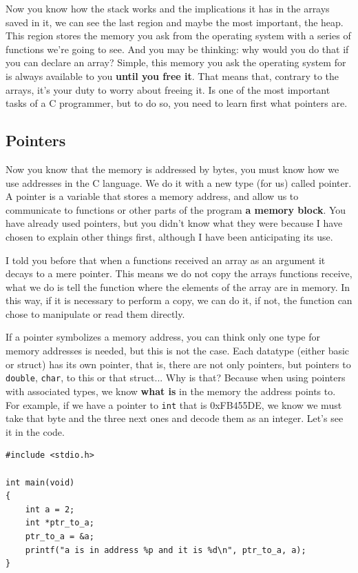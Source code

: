 \documentclass[a4paper]{article}
\begin{document}
Now you know how the stack works and the implications it has in the arrays
saved in it, we can see the last region and maybe the most important, the heap.
This region stores the memory you ask from the operating system with a series of
functions we're going to see. And you may be thinking: why would you do that if
you can declare an array? Simple, this memory you ask the operating system for
is always available to you \textbf{until you free it}. That means that,
contrary to the arrays, it's your duty to worry about freeing it. Is one of the
most important tasks of a C programmer, but to do so, you need to learn first
what pointers are.

\subsection{Pointers}
Now you know that the memory is addressed by bytes, you must know how we use
addresses in the C language. We do it with a new type (for us) called pointer.
A pointer is a variable that stores a memory address, and allow us to
communicate to functions or other parts of the program \textbf{a memory block}.
You have already used pointers, but you didn't know what they were because I
have chosen to explain other things first, although I have been anticipating
its use.

I told you before that when a functions received an array as an argument it
decays to a mere pointer. This means we do not copy the arrays functions
receive, what we do is tell the function where the elements of the array are in
memory. In this way, if it is necessary to perform a copy, we can do it, if
not, the function can chose to manipulate or read them directly.

If a pointer symbolizes a memory address, you can think only one type for memory
addresses is needed, but this is not the case. Each datatype (either basic or
struct) has its own pointer, that is, there are not only pointers, but pointers
to \texttt{double}, \verb!char!, to this or that struct... Why is that? Because
when using pointers with associated types, we know \textbf{what is} in the
memory the address points to. For example, if we have a pointer to \verb!int!
that is 0xFB455DE, we know we must take that byte and the three next ones and
decode them as an integer. Let's see it in the code.

\noindent
\begin{minipage}[H]{\linewidth}
\mbox{}
\begin{lstlisting}[style=C, label={lst:pointers1},
caption={Pointer declaration}]
#include <stdio.h>

int main(void)
{
    int a = 2;
    int *ptr_to_a;
    ptr_to_a = &a;
    printf("a is in address %p and it is %d\n", ptr_to_a, a);
}
\end{lstlisting}
\end{minipage}
\end{document}

